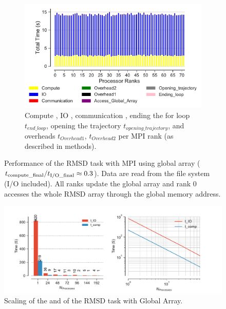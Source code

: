 \begin{figure}
\begin{subfigure} {.8\textwidth}
  \includegraphics[width=\linewidth]{figures/split-ga-BarPlot-rank-comparison_72_5.pdf}
  \caption{Compute \tcomp, IO \tIO, communication \tcomm , ending the for loop $t_{end\_loop}$,
  opening the trajectory $t_{opening\_trajectory}$, and overheads $t_{Overhead1}$,  $t_{Overhead2}$ per MPI rank (as described in methods).}
  \label{fig:MPIranks-split-ga}
\end{subfigure}
%
\caption{Performance of the RMSD task with MPI using global array (${t}_{\text{compute\_final}}/{t}_{\text{I/O\_final}} \approx 0.3$).
Data are read from the file system (I/O included). All ranks update the global array and rank 0 accesses the whole RMSD array through the global memory address.}
\label{fig:MPIwithIO-split-ga}
\end{figure}

\begin{figure}
\centering
  \includegraphics[width=\linewidth]{figures/split-ga-time_IO_comparison.pdf}
\caption{Scaling of the \tcomp and \tIO of the RMSD task with Global Array.}
\label{fig:ScalingComputeIO-split-ga}
\end{figure}

